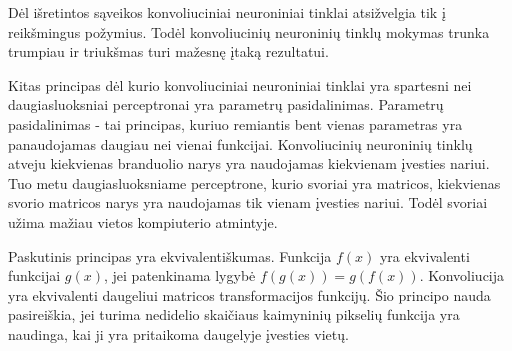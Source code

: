 Dėl išretintos sąveikos konvoliuciniai neuroniniai tinklai atsižvelgia tik į reikšmingus požymius. Todėl konvoliucinių neuroninių tinklų mokymas trunka trumpiau ir triukšmas turi mažesnę įtaką rezultatui.

Kitas principas dėl kurio konvoliuciniai neuroniniai tinklai yra spartesni nei daugiasluoksniai perceptronai yra parametrų pasidalinimas. Parametrų pasidalinimas - tai principas, kuriuo remiantis bent vienas parametras yra panaudojamas daugiau nei vienai funkcijai. Konvoliucinių neuroninių tinklų atveju kiekvienas branduolio narys yra naudojamas kiekvienam įvesties nariui. Tuo metu daugiasluoksniame perceptrone, kurio svoriai yra matricos, kiekvienas svorio matricos narys yra naudojamas tik vienam įvesties nariui. Todėl svoriai užima mažiau vietos kompiuterio atmintyje.

Paskutinis principas yra ekvivalentiškumas. Funkcija $f(x)$ yra ekvivalenti funkcijai $g(x)$, jei patenkinama lygybė $f(g(x)) = g(f(x))$. Konvoliucija yra ekvivalenti daugeliui matricos transformacijos funkcijų. Šio principo nauda pasireiškia, jei turima nedidelio skaičiaus kaimyninių pikselių funkcija yra naudinga, kai ji yra pritaikoma daugelyje įvesties vietų.
